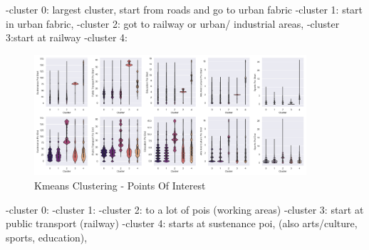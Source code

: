 -cluster 0: largest cluster, start from roads and go to urban fabric
-cluster 1: start in urban fabric,
-cluster 2: got to railway or urban/ industrial areas,
-cluster 3:start at railway
-cluster 4:

\begin{figure}[htp]
    \centering
    \includegraphics[width=0.9\textwidth]{Figures/Clustering/clusters_sustenance_poi_start.png}
    \caption{Kmeans Clustering - Points Of Interest}
    \label{fig:kmeans_poi}
\end{figure}

-cluster 0:
-cluster 1:
-cluster 2: to a lot of pois (working areas)
-cluster 3: start at public transport (railway)
-cluster 4: starts at sustenance poi, (also arts/culture, sports, education),
